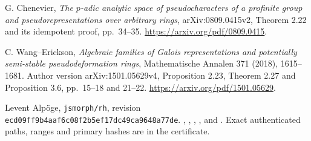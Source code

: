 G. Chenevier, \emph{The \(p\)-adic analytic space of pseudocharacters
of a profinite group and pseudorepresentations over arbitrary rings},
arXiv:0809.0415v2, Theorem 2.22 and its idempotent proof, pp.~34--35.
\url{https://arxiv.org/pdf/0809.0415}.

C. Wang--Erickson, \emph{Algebraic families of Galois representations
and potentially semi-stable pseudodeformation rings},
Mathematische Annalen 371 (2018), 1615--1681.
Author version arXiv:1501.05629v4, Proposition 2.23,
Theorem 2.27 and Proposition 3.6, pp.~15--18 and 21--22.
\url{https://arxiv.org/pdf/1501.05629}.

{\raggedright
Levent Alp\"oge, \texttt{jsmorph/rh},
revision \texttt{ecd09ff9b4aaf6c08f2b5ef17dc49ca9648a77de}.
,
,
,
,
and .
Exact authenticated paths, ranges and primary hashes are in the
 certificate.
\par}

